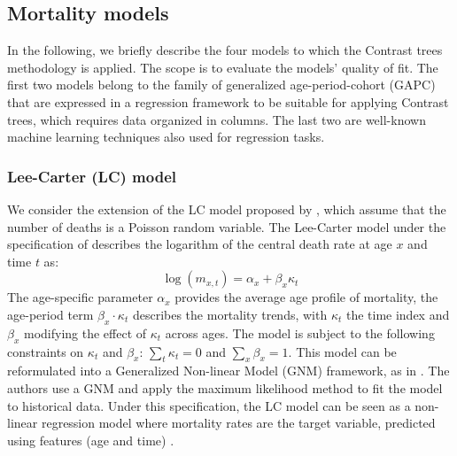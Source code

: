 \documentclass[a4,11pt]{article}
\begin{document}
\subsection{Mortality models}
In the following, we briefly describe the four models to which the Contrast trees methodology is applied. The scope is to evaluate the models' quality of fit. 
The first two models belong to the family of generalized age-period-cohort (GAPC) that are expressed in a regression framework to be suitable for applying Contrast trees, which requires data organized in columns. The last two are well-known machine learning techniques also used for regression tasks.\\

\subsubsection*{Lee-Carter (LC) model}
We consider the extension of the LC model\cite{LC92} proposed by \cite{BDV2002}, which assume that the number of deaths is a Poisson random variable.
The Lee-Carter model under the specification of \cite{BDV2002} describes the logarithm of the central death rate at age $x$ and time $t$ as:
\begin{equation} 
\label{eq:LC}
\log{\left(m_{x,t}\right)}=\alpha_{x}+\beta_{x} \kappa_{t}
\end{equation}
The age-specific parameter $\alpha_x$ provides the average age profile of mortality, the age-period term $\beta_{x}\cdot\kappa_t$ describes the mortality trends, with $\kappa_t$ the time index and $\beta_{x}$ modifying the effect of $\kappa_t$ across ages. The model is subject to the following constraints on $\kappa_t$ and $\beta_x$: $\sum_{t}{\kappa_t}=0$ and $\sum_{x}{\beta_x}=1$.
This model can be reformulated into a Generalized Non-linear Model (GNM) framework, as in \cite{Villegas2018}. The authors use a GNM and apply the maximum likelihood method to fit the model to historical data. Under this specification, the LC model can be seen as a non-linear regression model where mortality rates are the target variable, predicted using features (age and time) \cite{RichmanWuthrich}.
\end{document}
